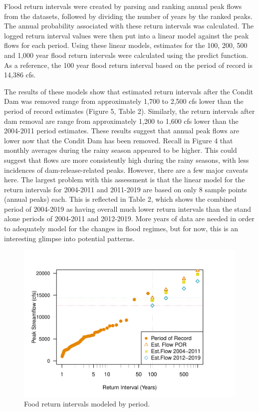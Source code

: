 \documentclass[
  12pt,
]{article}
\begin{document}
Flood return intervals were created by parsing and ranking annual peak
flows from the datasets, followed by dividing the number of years by the
ranked peaks. The annual probability associated with these return
intervals was calculated. The logged return interval values were then
put into a linear model against the peak flows for each period. Using
these linear models, estimates for the 100, 200, 500 and 1,000 year
flood return intervals were calculated using the predict function. As a
reference, the 100 year flood return interval based on the period of
record is 14,386 cfs.

The results of these models show that estimated return intervals after
the Condit Dam was removed range from approximately 1,700 to 2,500 cfs
lower than the period of record estimates (Figure 5, Table 2).
Similarly, the return intervals after dam removal are range from
approximately 1,200 to 1,600 cfs lower than the 2004-2011 period
estimates. These results suggest that annual peak flows are lower now
that the Condit Dam has been removed. Recall in Figure 4 that monthly
averages during the rainy season appeared to be higher. This could
suggest that flows are more consistently high during the rainy seasons,
with less incidences of dam-release-related peaks. However, there are a
few major caveats here. The largest problem with this assessment is that
the linear model for the return intervals for 2004-2011 and 2011-2019
are based on only 8 sample points (annual peaks) each. This is reflected
in Table 2, which shows the combined period of 2004-2019 as having
overall much lower return intervals than the stand alone periods of
2004-2011 and 2012-2019. More years of data are needed in order to
adequately model for the changes in flood regimes, but for now, this is
an interesting glimpse into potential patterns.

\begin{figure}
\centering
\includegraphics{WhiteSalmon_WriteUp_files/figure-latex/fig5-1.pdf}
\caption{Food return intervals modeled by period.}
\end{figure}
\end{document}
